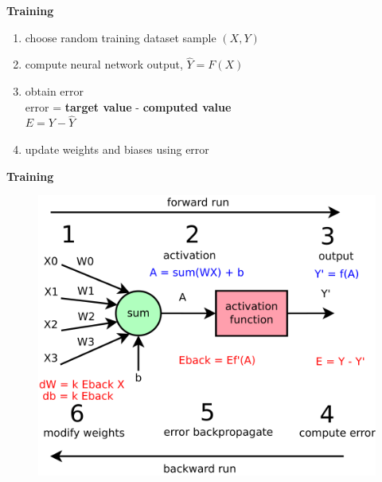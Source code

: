 \documentclass[xcolor=dvipsnames]{beamer}
\begin{document}
\begin{frame}{\bf Training}

\begin{enumerate}
  \item choose random training dataset sample $(X, Y)$
  \item compute neural network output, $\hat{Y} = F(X)$
  \item obtain error\\
    error = {\bf \color{green} target value} - {\bf \color{red} computed value} \\
    $E = Y - \hat{Y}$
  \item update weights and biases using error
\end{enumerate}

\end{frame}


\begin{frame}{\bf Training}

\begin{figure}
  \includegraphics[scale=0.3]{../../diagrams/nn/neuron_learn.png}
\end{figure}

\end{frame}
\end{document}
